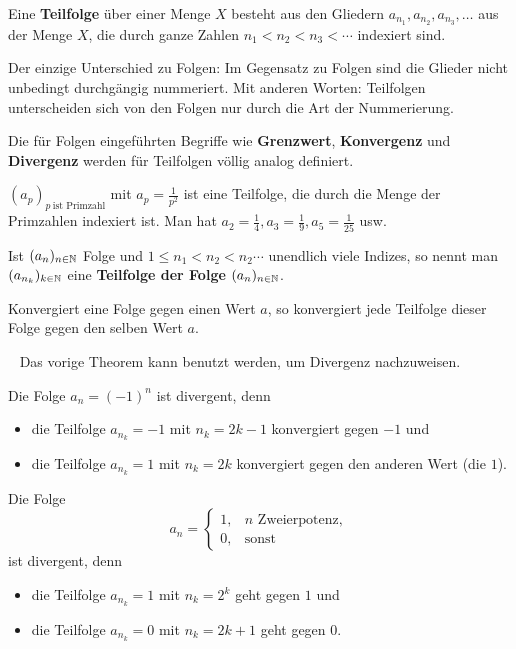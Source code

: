 \begin{defn} 
	Eine \textbf{Teilfolge} über einer Menge $X$ besteht aus den Gliedern $a_{n_1} , a_{n_2}, a_{n_3},\ldots$ aus der Menge $X$, die durch ganze Zahlen $n_1 < n_2 < n_3 <  \cdots$ indexiert sind. 
	
	Der einzige Unterschied zu Folgen: Im Gegensatz zu Folgen sind die Glieder nicht unbedingt durchgängig nummeriert. Mit anderen Worten: Teilfolgen unterscheiden sich von den Folgen nur durch die Art der Nummerierung. 
	
	Die für Folgen eingeführten Begriffe wie \textbf{Grenzwert}, \textbf{Konvergenz} und \textbf{Divergenz} werden für Teilfolgen völlig analog definiert. 
\end{defn} 

\begin{bsp}
	$(a_p)_{p \ \text{ist Primzahl}}$ mit $a_p = \frac{1}{p^2}$ ist eine Teilfolge, die durch die Menge der Primzahlen indexiert ist. Man hat $a_2 = \frac{1}{4}, a_3 = \frac{1}{9}, a_5 = \frac{1}{25}$ usw. 
\end{bsp} 

\begin{defn} 
	Ist $(a_n)_{n \in \mathbb{N}}$ Folge und $1 \le n_1 < n_2 < n_2 \cdots $ unendlich viele Indizes, so nennt man $(a_{n_k})_{k \in \mathbb{N}}$ eine \textbf{Teilfolge der Folge} $(a_n)_{n \in \mathbb{N}}$. 
\end{defn} 


\begin{thm}
	Konvergiert eine Folge gegen einen Wert $a$, so konvergiert jede Teilfolge dieser Folge gegen den selben Wert $a$. 
\end{thm} 

\begin{bsp} {\ } Das vorige Theorem kann benutzt werden, um Divergenz nachzuweisen. 
	\begin{enuma} 
		\item Die Folge $a_n = (-1)^n$ ist divergent, denn 
		\begin{itemize} 
			\item[] die Teilfolge  $a_{n_k} = -1$ mit $n_k = 2k-1$ konvergiert gegen $-1$ und 
			\item[] die Teilfolge $a_{n_k} = 1$ mit $n_k = 2k$ konvergiert gegen den anderen Wert (die $1$). 
		\end{itemize} 
		\item Die Folge 
		\[
			a_n = \begin{cases} 
				1, & \text{$n$ Zweierpotenz},
				\\ 0, & \text{sonst}
			\end{cases} 
		\]
		ist divergent, denn 
		\begin{itemize} 
			\item[] die Teilfolge $a_{n_k} = 1$ mit $n_k = 2^k$ geht gegen $1$ und 
			\item[] die Teilfolge $a_{n_k} = 0$ mit $n_k = 2 k +1$ geht gegen $0$. 
		\end{itemize} 
	\end{enuma} 
\end{bsp} 

